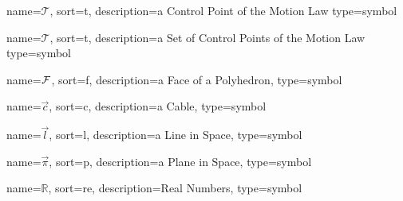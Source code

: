 
\newcommand\Tau{{T}}

	{%
		name=\ensuremath{\mathcal{T}},
		sort=t,
		description=a Control Point of the Motion Law
		type=symbol
	}
	\newcommand{\mlcontrolpoint}{\gls{sym:mlcontrolpoint}}

	{%
		name=\ensuremath{\mathscr{T}},
		sort=t,
		description=a Set of Control Points of the Motion Law
		type=symbol
	}
	\newcommand{\mlcontrolpointset}{\gls{sym:mlcontrolpointset}}

	{%
		name=\ensuremath{\set{F}},
		sort=f,
		description=a Face of a Polyhedron,
		type=symbol
	}
	\newcommand{\face}{\gls{sym:face}}

	{%
		name=\ensuremath{\vec{c}},
		sort=c,
		description=a Cable,
		type=symbol
	}
	\newcommand{\cable}{\gls{sym:cable}}

	{%
		name=\ensuremath{\vec{l}},
		sort=l,
		description=a Line in Space,
		type=symbol
	}
	\newcommand{\linevec}{\gls{sym:linevec}}

	{%
		name=\ensuremath{\vec{\pi}},
		sort=p,
		description=a Plane in Space,
		type=symbol
	}
	\newcommand{\plane}{\gls{sym:plane}}

	{%
		name=\ensuremath{\mathds{R}},
		sort=re,
		description=Real Numbers,
		type=symbol
	}
	\renewcommand{\Re}{\gls{sym:Re}}


